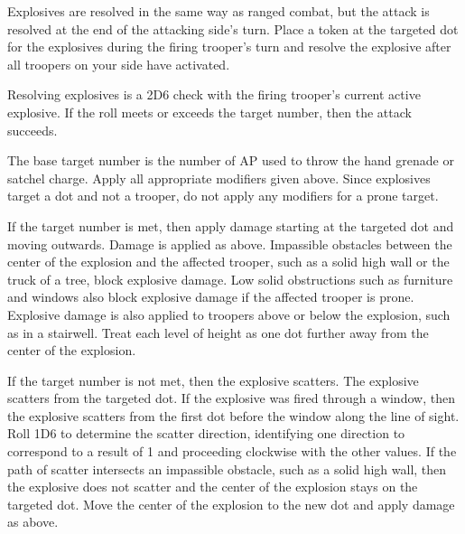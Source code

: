 Explosives are resolved in the same way as ranged combat, but the attack is resolved at the end of the attacking side's turn.
Place a token at the targeted dot for the explosives during the firing trooper's turn and resolve the explosive after all troopers on your side have activated.

Resolving explosives is a 2D6 check with the firing trooper's current active explosive.
If the roll meets or exceeds the target number, then the attack succeeds.

The base target number is the number of AP used to throw the hand grenade or satchel charge.
Apply all appropriate modifiers given above.
Since explosives target a dot and not a trooper, do not apply any modifiers for a prone target.

If the target number is met, then apply damage starting at the targeted dot and moving outwards.
Damage is applied as above.
Impassible obstacles between the center of the explosion and the affected trooper, such as a solid high wall or the truck of a tree, block explosive damage.
Low solid obstructions such as furniture and windows also block explosive damage if the affected trooper is prone.
Explosive damage is also applied to troopers above or below the explosion, such as in a stairwell.
Treat each level of height as one dot further away from the center of the explosion.

If the target number is not met, then the explosive scatters.
The explosive scatters from the targeted dot.
If the explosive was fired through a window, then the explosive scatters from the first dot before the window along the line of sight.
Roll 1D6 to determine the scatter direction, identifying one direction to correspond to a result of 1 and proceeding clockwise with the other values.
If the path of scatter intersects an impassible obstacle, such as a solid high wall, then the explosive does not scatter and the center of the explosion stays on the targeted dot.
Move the center of the explosion to the new dot and apply damage as above.
